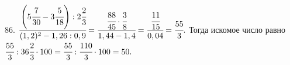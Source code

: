 86. $\cfrac{\left(5\cfrac{7}{30}-3\cfrac{5}{18}\right):2\cfrac{2}{3}}{(1,2)^2-1,26:0,9}=
\cfrac{\cfrac{88}{45}\cdot\cfrac{3}{8}}{1,44-1,4}=\cfrac{\cfrac{11}{15}}{0,04}=\cfrac{55}{3}.$ Тогда искомое число равно
$\cfrac{55}{3}:36\cfrac{2}{3}\cdot100=\cfrac{55}{3}:\cfrac{110}{3}\cdot100=50.$\\
